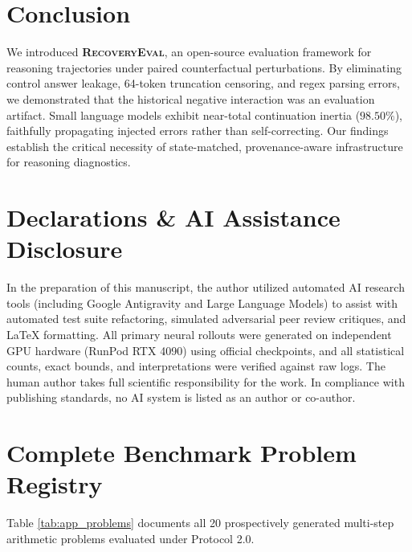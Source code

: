 \documentclass[11pt,letterpaper]{article}
\newcommand{\framework}{\textsc{RecoveryEval}}
\begin{document}
\section{Conclusion}

We introduced \textbf{\framework}, an open-source evaluation framework for reasoning trajectories under paired counterfactual perturbations. By eliminating control answer leakage, 64-token truncation censoring, and regex parsing errors, we demonstrated that the historical negative interaction was an evaluation artifact. Small language models exhibit near-total continuation inertia ($98.50\%$), faithfully propagating injected errors rather than self-correcting. Our findings establish the critical necessity of state-matched, provenance-aware infrastructure for reasoning diagnostics.

\section*{Declarations \& AI Assistance Disclosure}
In the preparation of this manuscript, the author utilized automated AI research tools (including Google Antigravity and Large Language Models) to assist with automated test suite refactoring, simulated adversarial peer review critiques, and LaTeX formatting. All primary neural rollouts were generated on independent GPU hardware (RunPod RTX 4090) using official checkpoints, and all statistical counts, exact bounds, and interpretations were verified against raw logs. The human author takes full scientific responsibility for the work. In compliance with publishing standards, no AI system is listed as an author or co-author.




\newpage
\appendix

\section{Complete Benchmark Problem Registry}
\label{app:problems}
Table \ref{tab:app_problems} documents all 20 prospectively generated multi-step arithmetic problems evaluated under Protocol 2.0.
\end{document}
